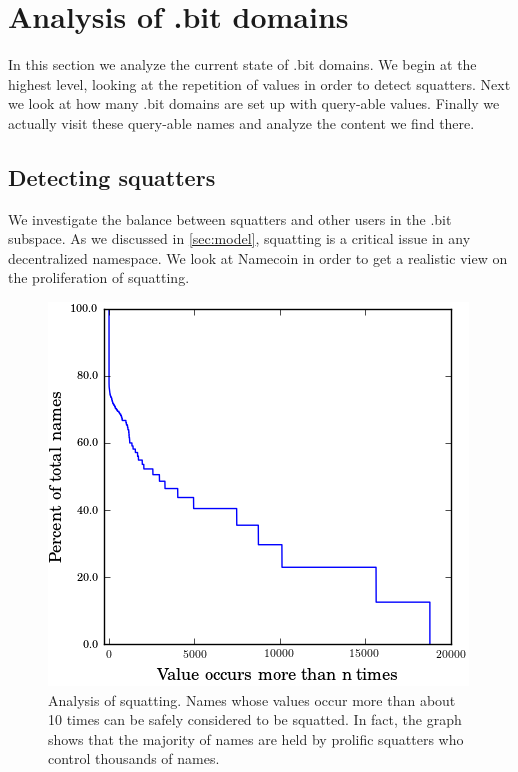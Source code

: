 \section{Analysis of .bit domains}
\label{sec:domains}

In this section we analyze the current state of .bit domains. We begin at the highest level, looking at the repetition of values in order to detect squatters. Next we look at how many .bit domains are set up with query-able values. Finally we actually visit these query-able names and analyze the content we find there.

\subsection{Detecting squatters}

We investigate the balance between squatters and other users in the .bit subspace. As we discussed in \ref{sec:model}, squatting is a critical issue in any decentralized namespace. We look at Namecoin in order to get a realistic view on the proliferation of squatting.

\begin{figure}
  \centering
  \includegraphics[width=0.9\columnwidth]{figures/squatters}
  \caption{Analysis of squatting. Names whose values occur more than about 10 times can be safely considered to be squatted. In fact, the graph shows that the majority of names are held by prolific squatters who control thousands of names.  }
  \label{fig:percentSquatter}
\end{figure}

